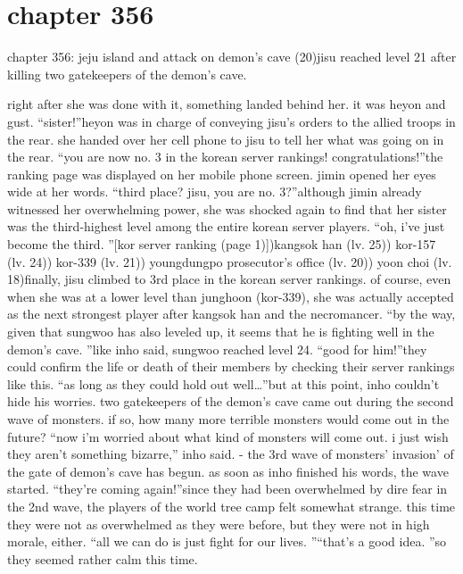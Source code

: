 \section{chapter 356}

chapter 356: jeju island and attack on demon’s cave (20)jisu reached level 21 after killing two gatekeepers of the demon’s cave.





right after she was done with it, something landed behind her.
 it was heyon and gust.
“sister!”heyon was in charge of conveying jisu’s orders to the allied troops in the rear.
 she handed over her cell phone to jisu to tell her what was going on in the rear.
“you are now no.
 3 in the korean server rankings! congratulations!”the ranking page was displayed on her mobile phone screen.
 jimin opened her eyes wide at her words.
“third place? jisu, you are no.
 3?”although jimin already witnessed her overwhelming power, she was shocked again to find that her sister was the third-highest level among the entire korean server players.
“oh, i’ve just become the third.
”[kor server ranking (page 1)])kangsok han (lv.
 25)) kor-157 (lv.
 24)) kor-339 (lv.
 21)) youngdungpo prosecutor’s office (lv.
 20)) yoon choi (lv.
 18)finally, jisu climbed to 3rd place in the korean server rankings.
 of course, even when she was at a lower level than junghoon (kor-339), she was actually accepted as the next strongest player after kangsok han and the necromancer.
“by the way, given that sungwoo has also leveled up, it seems that he is fighting well in the demon’s cave.
”like inho said, sungwoo reached level 24.
“good for him!”they could confirm the life or death of their members by checking their server rankings like this.
 “as long as they could hold out well…”but at this point, inho couldn’t hide his worries.
 two gatekeepers of the demon’s cave came out during the second wave of monsters.
if so, how many more terrible monsters would come out in the future?
“now i’m worried about what kind of monsters will come out.
 i just wish they aren’t something bizarre,” inho said.
- the 3rd wave of monsters’ invasion’ of the gate of demon’s cave has begun.
as soon as inho finished his words, the wave started.
“they’re coming again!”since they had been overwhelmed by dire fear in the 2nd wave, the players of the world tree camp felt somewhat strange.
this time they were not as overwhelmed as they were before, but they were not in high morale, either.
“all we can do is just fight for our lives.
”“that’s a good idea.
”so they seemed rather calm this time.
